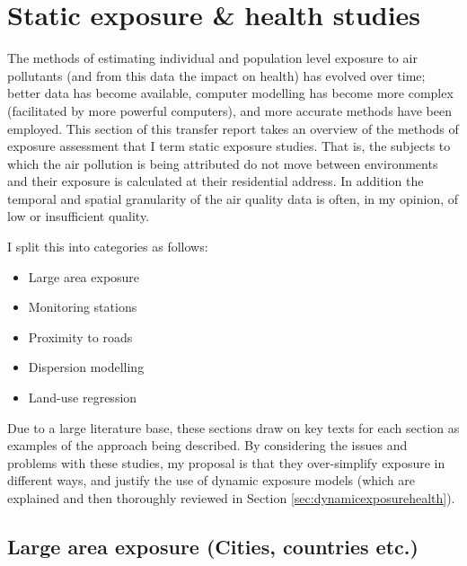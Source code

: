 \newpage

\section{Static exposure \& health studies}
\label{sec:staticexposurehealth}

The methods of estimating individual and population level exposure to air pollutants (and from this data the impact on health) has evolved over time; better data has become available, computer modelling has become more complex (facilitated by more powerful computers), and more accurate methods have been employed. This section of this transfer report takes an overview of the methods of exposure assessment that I term static exposure studies. That is, the subjects to which the air pollution is being attributed do not move between environments and their exposure is calculated at their residential address. In addition the temporal and spatial granularity of the air quality data is often, in my opinion, of low or insufficient quality.\hfill

I split this into categories as follows:

\begin{itemize}
\item Large area exposure
\item Monitoring stations
\item Proximity to roads
\item Dispersion modelling
\item Land-use regression
\end{itemize}

Due to a large literature base, these sections draw on key texts for each section as examples of the approach being described. By considering the issues and problems with these studies, my proposal is that they over-simplify exposure in different ways, and justify the use of dynamic exposure models (which are explained and then thoroughly reviewed in Section \ref{sec:dynamicexposurehealth}).\hfill


\subsection{Large area exposure (Cities, countries etc.)}
\label{subsec:largearea}

